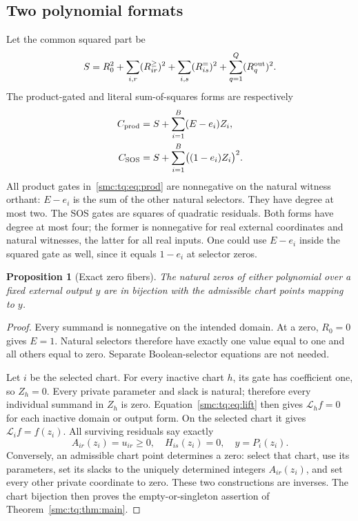 \documentclass[11pt,letterpaper]{article}
\numberwithin{equation}{section}
\newtheorem{proposition}[theorem]{Proposition}
\theoremstyle{definition}
\theoremstyle{remark}
\newcommand{\Lift}{\mathcal L}\newcommand{\inorm}[1]{\lVert#1\rVert_\infty}
\begin{document}
\subsection{Two polynomial formats}
Let the common squared part be
\[
 S=R_0^2+\sum_{i,r}(R_{ir}^{\ge})^2
       +\sum_{i,s}(R_{is}^{=})^2+\sum_{q=1}^{Q}(R_q^{\rm out})^2.
\]
The product-gated and literal sum-of-squares forms are respectively
\begin{align}
 C_{\rm prod}&=S+\sum_{i=1}^{B}(E-e_i)Z_i,\label{smc:tq:eq:prod}\\
 C_{\rm SOS}&=S+\sum_{i=1}^{B}\bigl((1-e_i)Z_i\bigr)^2.
 \label{smc:tq:eq:sos}
\end{align}
All product gates in~\eqref{smc:tq:eq:prod} are nonnegative on the natural witness
orthant: $E-e_i$ is the sum of the other natural selectors. They have
degree at most two. The SOS gates are squares of quadratic residuals.
Both forms have degree at most four; the former is nonnegative for real
external coordinates and natural witnesses, the latter for all real inputs.
One could use $E-e_i$ inside the squared gate as well, since it equals
$1-e_i$ at selector zeros.

\begin{proposition}[Exact zero fibers]\label{smc:tq:prop:compiler}
The natural zeros of either polynomial over a fixed external output $y$
are in bijection with the admissible chart points mapping to $y$.
\end{proposition}
\begin{proof}
Every summand is nonnegative on the intended domain. At a zero, $R_0=0$
gives $E=1$. Natural selectors therefore have exactly one value equal to
one and all others equal to zero. Separate Boolean-selector equations are
not needed.

Let $i$ be the selected chart. For every inactive chart $h$, its gate has
coefficient one, so $Z_h=0$. Every private parameter and slack is natural;
therefore every individual summand in $Z_h$ is zero. Equation~\eqref{smc:tq:eq:lift}
then gives $\Lift_h f=0$ for each inactive domain or output form. On the
selected chart it gives $\Lift_i f=f(z_i)$. All surviving residuals say
exactly
\[
 A_{ir}(z_i)=u_{ir}\ge0,\quad H_{is}(z_i)=0,\quad y=P_i(z_i).
\]
Conversely, an admissible chart point determines a zero: select that chart,
use its parameters, set its slacks to the uniquely determined integers
$A_{ir}(z_i)$, and set every other private coordinate to zero.
These two constructions are inverses. The chart bijection then proves the
empty-or-singleton assertion of Theorem~\ref{smc:tq:thm:main}.
\end{proof}
\end{document}
